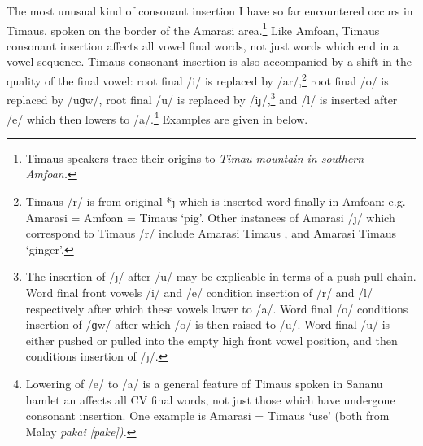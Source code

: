 The most unusual kind of consonant insertion I have so far encountered
occurs in Timaus, spoken on the border of the Amarasi area.\footnote{
		Timaus speakers trace their origins to \it{Timau} mountain in southern Amfo{\Q}an.}
Like Amfo{\Q}an, Timaus consonant insertion affects all vowel final words,
not just words which end in a vowel sequence.
Timaus consonant insertion is also accompanied by a shift in the quality of the final vowel:
root final /i/ is replaced by /ar/,\footnote{
		Timaus /r/ is from original *{\j} which is
		inserted word finally in Amfo{\Q}an: e.g. Amarasi 
		= Amfo{\Q}an  = Timaus  `pig'.
		Other instances of Amarasi /\j/ which correspond to Timaus /r/
		include Amarasi  Timaus ,
		and Amarasi  Timaus  `ginger'.}
root final /o/ is replaced by /uɡw/,
root final /u/ is replaced by /i\j/,\footnote{
		The insertion of /\j/ after /u/ may be explicable in terms of a push-pull chain.
		Word final front vowels /i/ and /e/ condition insertion of /r/ and /l/
		respectively after which these vowels lower to /a/.
		Word final /o/ conditions insertion of /ɡw/ after which /o/ is then raised to /u/.
		Word final /u/ is either pushed or pulled into the empty high front vowel position,
		and then conditions insertion of /\j/.}
and /l/ is inserted after /e/ which then lowers to /a/.\footnote{
		Lowering of /e/ to /a/ is a general feature of Timaus spoken in Sananu
		hamlet an affects all CV final words, not just those which have undergone consonant insertion.
		One example is Amarasi  = Timaus  `use' (both from Malay \it{pakai} [pake]).}
Examples are given in  below.

\begin{exe}
	\label{ex:TimConIns}
\end{exe}

